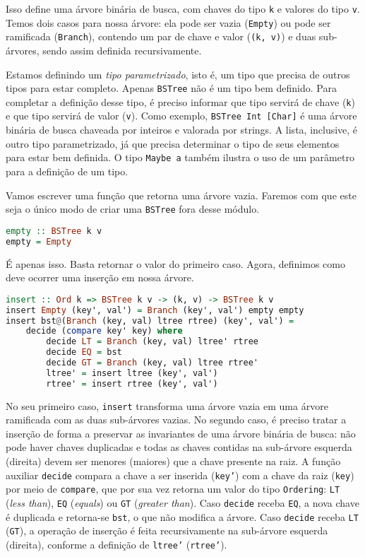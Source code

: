 \documentclass[a4paper]{article}
\begin{document}
Isso define uma árvore binária de busca, com chaves do tipo \texttt{k} e valores do tipo \texttt{v}.
Temos dois casos para nossa árvore: ela pode ser vazia (\texttt{Empty}) ou pode ser ramificada (\texttt{Branch}), contendo um par de chave e valor (\texttt{(k, v)}) e duas sub-árvores, sendo assim definida recursivamente.

Estamos definindo um \emph{tipo parametrizado}, isto é, um tipo que precisa de outros tipos para estar completo.
Apenas \texttt{BSTree} não é um tipo bem definido.
Para completar a definição desse tipo, é preciso informar que tipo servirá de chave (\texttt{k}) e que tipo servirá de valor (\texttt{v}).
Como exemplo, \texttt{BSTree Int [Char]} é uma árvore binária de busca chaveada por inteiros e valorada por strings.
A lista, inclusive, é outro tipo parametrizado, já que precisa determinar o tipo de seus elementos para estar bem definida.
O tipo \texttt{Maybe a} também ilustra o uso de um parâmetro para a definição de um tipo.

Vamos escrever uma função que retorna uma árvore vazia.
Faremos com que este seja o único modo de criar uma \texttt{BSTree} fora desse módulo.

\begin{lstlisting}[language=haskell, frame=single]
empty :: BSTree k v
empty = Empty
\end{lstlisting}

É apenas isso.
Basta retornar o valor do primeiro caso.
Agora, definimos como deve ocorrer uma inserção em nossa árvore.

\begin{lstlisting}[language=haskell, frame=single]
insert :: Ord k => BSTree k v -> (k, v) -> BSTree k v
insert Empty (key', val') = Branch (key', val') empty empty
insert bst@(Branch (key, val) ltree rtree) (key', val') =
	decide (compare key' key) where
		decide LT = Branch (key, val) ltree' rtree
		decide EQ = bst
		decide GT = Branch (key, val) ltree rtree'
		ltree' = insert ltree (key', val')
		rtree' = insert rtree (key', val')
\end{lstlisting}

No seu primeiro caso, \texttt{insert} transforma uma árvore vazia em uma árvore ramificada com as duas sub-árvores vazias.
No segundo caso, é preciso tratar a inserção de forma a preservar as invariantes de uma árvore binária de busca: não pode haver chaves duplicadas e todas as chaves contidas na sub-árvore esquerda (direita) devem ser menores (maiores) que a chave presente na raiz.
A função auxiliar \texttt{decide} compara a chave a ser inserida (\texttt{key'}) com a chave da raiz (\texttt{key}) por meio de \texttt{compare}, que por sua vez retorna um valor do tipo \texttt{Ordering}: \texttt{LT} (\emph{less than}), \texttt{EQ} (\emph{equals}) ou \texttt{GT} (\emph{greater than}).
Caso \texttt{decide} receba \texttt{EQ}, a nova chave é duplicada e retorna-se \texttt{bst}, o que não modifica a árvore.
Caso \texttt{decide} receba \texttt{LT} (\texttt{GT}), a operação de inserção é feita recursivamente na sub-árvore esquerda (direita), conforme a definição de \texttt{ltree'} (\texttt{rtree'}).
\end{document}
